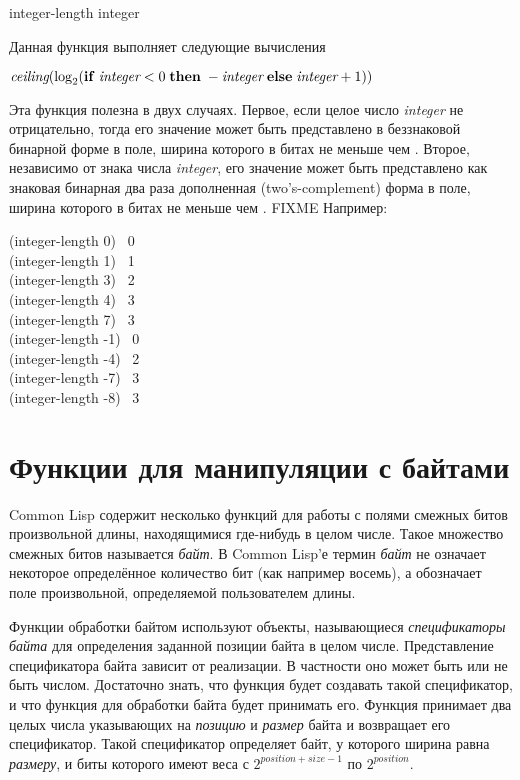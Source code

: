 \begin{defun}[Функция]
integer-length integer

Данная функция выполняет следующие вычисления
\begin{tabbing}
$ \emph{ceiling}(\log_2 ({\bf if}\; \emph{integer} < 0 \;{\bf then} \;
    -\emph{integer} \;{\bf else}\; \emph{integer}+1)) $
\end{tabbing}
Эта функция полезна в двух случаях.
Первое, если целое число \emph{integer} не отрицательно, тогда его значение
может быть представлено в беззнаковой бинарной форме в поле, ширина которого в
битах не меньше чем .
Второе, независимо от знака числа \emph{integer}, его значение может быть
представлено как знаковая бинарная два раза дополненная (two's-complement) форма
в поле, ширина которого в битах не меньше чем
 . FIXME
Например:
\begin{lisp}
(integer-length 0) \EV\ 0 \\
(integer-length 1) \EV\ 1 \\
(integer-length 3) \EV\ 2 \\
(integer-length 4) \EV\ 3 \\
(integer-length 7) \EV\ 3 \\
(integer-length -1) \EV\ 0 \\
(integer-length -4) \EV\ 2 \\
(integer-length -7) \EV\ 3 \\
(integer-length -8) \EV\ 3
\end{lisp}
\end{defun}


\section{Функции для манипуляции с байтами}

Common Lisp содержит несколько функций для работы с полями смежных битов
произвольной длины, находящимися где-нибудь в целом числе.
Такое множество смежных битов называется \emph{байт}.
В Common Lisp'е термин \emph{байт} не означает некоторое определённое количество
бит (как например восемь), а обозначает поле произвольной, определяемой
пользователем длины.

Функции обработки байтом используют объекты, называющиеся \emph{спецификаторы
  байта} для определения заданной позиции байта в целом числе.
Представление спецификатора байта зависит от реализации. В частности оно может
быть или не быть числом.
Достаточно знать, что функция  будет создавать такой спецификатор, и
что функция для обработки байта будет принимать его.
Функция  принимает два целых числа указывающих на \emph{позицию} и
\emph{размер} байта и возвращает его спецификатор.
Такой спецификатор определяет байт, у которого ширина равна \emph{размеру}, и
биты которого имеют веса с $ 2^{position+size-1} $
по $ 2^{position} $.

